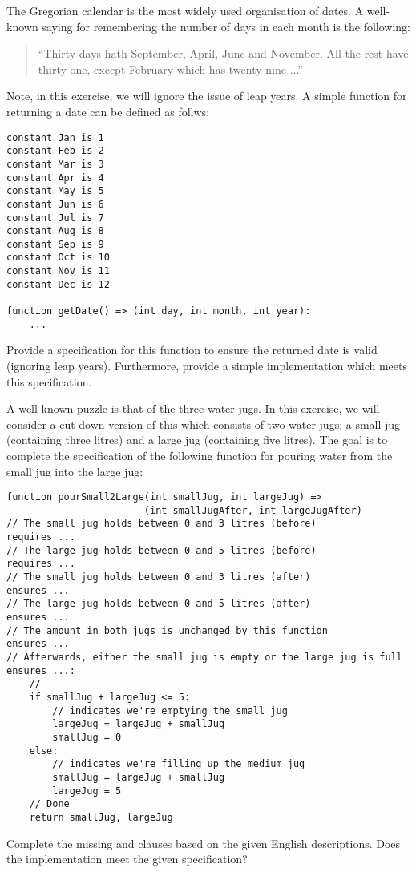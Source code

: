 \begin{ex}
The Gregorian calendar is the most widely used organisation of dates.
A well-known saying for remembering the number of days in each month
is the following:
\begin{quote}
``Thirty days hath September, April, June and November.  All the rest
have thirty-one, except February which has twenty-nine ...''
\end{quote}
Note, in this exercise, we will ignore the issue of leap years.  A
simple function for returning a date can be defined as follws:
\begin{lstlisting}
constant Jan is 1
constant Feb is 2
constant Mar is 3
constant Apr is 4
constant May is 5
constant Jun is 6
constant Jul is 7
constant Aug is 8
constant Sep is 9
constant Oct is 10
constant Nov is 11
constant Dec is 12

function getDate() => (int day, int month, int year):
    ...
\end{lstlisting}
Provide a specification for this function to ensure the returned date
is valid (ignoring leap years).  Furthermore, provide a simple
implementation which meets this specification.
\end{ex}

\begin{ex}
A well-known puzzle is that of the three water jugs.  In this
exercise, we will consider a cut down version of this which consists
of two water jugs: a small jug (containing three litres) and a large
jug (containing five litres).  The goal is to complete the
specification of the following function for pouring water from the
small jug into the large jug:

\begin{lstlisting}
function pourSmall2Large(int smallJug, int largeJug) => 
                        (int smallJugAfter, int largeJugAfter)
// The small jug holds between 0 and 3 litres (before)
requires ...
// The large jug holds between 0 and 5 litres (before)
requires ...
// The small jug holds between 0 and 3 litres (after)
ensures ...
// The large jug holds between 0 and 5 litres (after)
ensures ...
// The amount in both jugs is unchanged by this function
ensures ...
// Afterwards, either the small jug is empty or the large jug is full
ensures ...:
    //
    if smallJug + largeJug <= 5:
        // indicates we're emptying the small jug
        largeJug = largeJug + smallJug
        smallJug = 0
    else:
        // indicates we're filling up the medium jug    
        smallJug = largeJug + smallJug
        largeJug = 5
    // Done
    return smallJug, largeJug
\end{lstlisting}
Complete the missing  and 
clauses based on the given English descriptions.  Does the implementation meet the given specification?
\end{ex}
